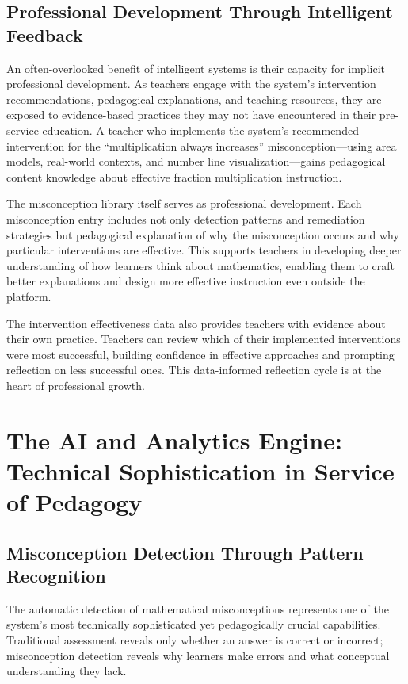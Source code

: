 \documentclass[12pt,a4paper]{article}
\begin{document}
\subsection{Professional Development Through Intelligent Feedback}

An often-overlooked benefit of intelligent systems is their capacity for implicit professional development. As teachers engage with the system's intervention recommendations, pedagogical explanations, and teaching resources, they are exposed to evidence-based practices they may not have encountered in their pre-service education. A teacher who implements the system's recommended intervention for the ``multiplication always increases'' misconception---using area models, real-world contexts, and number line visualization---gains pedagogical content knowledge about effective fraction multiplication instruction.

The misconception library itself serves as professional development. Each misconception entry includes not only detection patterns and remediation strategies but pedagogical explanation of why the misconception occurs and why particular interventions are effective. This supports teachers in developing deeper understanding of how learners think about mathematics, enabling them to craft better explanations and design more effective instruction even outside the platform.

The intervention effectiveness data also provides teachers with evidence about their own practice. Teachers can review which of their implemented interventions were most successful, building confidence in effective approaches and prompting reflection on less successful ones. This data-informed reflection cycle is at the heart of professional growth.

\section{The AI and Analytics Engine: Technical Sophistication in Service of Pedagogy}

\subsection{Misconception Detection Through Pattern Recognition}

The automatic detection of mathematical misconceptions represents one of the system's most technically sophisticated yet pedagogically crucial capabilities. Traditional assessment reveals only whether an answer is correct or incorrect; misconception detection reveals why learners make errors and what conceptual understanding they lack.
\end{document}

